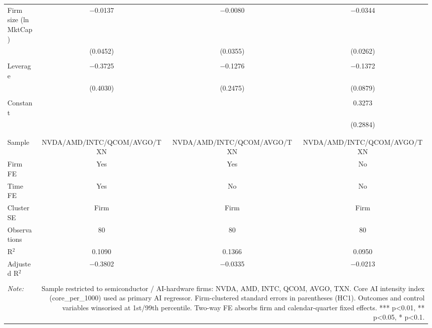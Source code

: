 \begin{table}[!htbp]
\begin{tabular}{@{\extracolsep{5pt}}lccc}
 Firm size (ln MktCap) & $-$0.0137 & $-$0.0080 & $-$0.0344 \\ 
  & (0.0452) & (0.0355) & (0.0262) \\ 
  & & & \\ 
 Leverage & $-$0.3725 & $-$0.1276 & $-$0.1372 \\ 
  & (0.4030) & (0.2475) & (0.0879) \\ 
  & & & \\ 
 Constant &  &  & 0.3273 \\ 
  &  &  & (0.2884) \\ 
  & & & \\ 
\hline \\[-1.8ex] 
Sample & NVDA/AMD/INTC/QCOM/AVGO/TXN & NVDA/AMD/INTC/QCOM/AVGO/TXN & NVDA/AMD/INTC/QCOM/AVGO/TXN \\ 
Firm FE & Yes & Yes & No \\ 
Time FE & Yes & No & No \\ 
Cluster SE & Firm & Firm & Firm \\ 
Observations & 80 & 80 & 80 \\ 
R$^{2}$ & 0.1090 & 0.1366 & 0.0950 \\ 
Adjusted R$^{2}$ & $-$0.3802 & $-$0.0335 & $-$0.0213 \\ 
\hline 
\hline \\[-1.8ex] 
\textit{Note:}  & \multicolumn{3}{r}{Sample restricted to semiconductor / AI-hardware firms: NVDA, AMD, INTC, QCOM, AVGO, TXN. Core AI intensity index (core_per_1000) used as primary AI regressor. Firm-clustered standard errors in parentheses (HC1). Outcomes and control variables winsorised at 1st/99th percentile. Two-way FE absorbs firm and calendar-quarter fixed effects. *** p<0.01, ** p<0.05, * p<0.1.} \\ 
\end{tabular} 
\end{table} 
